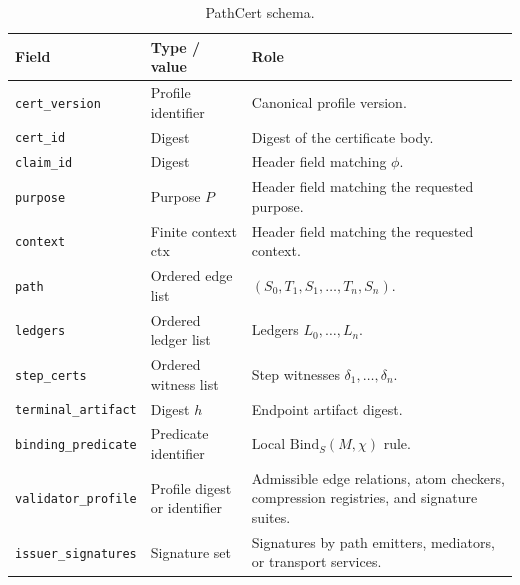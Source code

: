 \documentclass[11pt,twoside]{article}
\newcommand{\OGSchemaTableFont}{\footnotesize}
\newcommand{\OGTableHeaderRow}{\rowcolor{tableheaderbg}}
\newcommand{\TableHeaderRow}{\OGTableHeaderRow}
\newenvironment{OGTable}[2][ht]{%
  \begin{table}[#1]
  \centering
  #2
  \renewcommand{\arraystretch}{1.08}%
  \rowcolors{2}{tablerowbg}{white}%
}{%
  \rowcolors{2}{}{}%
  \end{table}%
}
\theoremstyle{definition}
\newcommand{\Bind}{\mathrm{Bind}}
\newcommand{\ctx}{\mathrm{ctx}}
\begin{document}
\begin{OGTable}{\OGSchemaTableFont}
\begin{tabularx}{\textwidth}{>{\raggedright\arraybackslash}p{}>{\raggedright\arraybackslash}p{}>{\raggedright\arraybackslash}X}
\toprule
\TableHeaderRow \textbf{Field} & \textbf{Type / value} & \textbf{Role} \\
\midrule
\texttt{cert\_version} & Profile identifier & Canonical profile version. \\
\texttt{cert\_id} & Digest & Digest of the certificate body. \\
\texttt{claim\_id} & Digest & Header field matching $\phi$. \\
\texttt{purpose} & Purpose $P$ & Header field matching the requested purpose. \\
\texttt{context} & Finite context $\ctx$ & Header field matching the requested context. \\
\texttt{path} & Ordered edge list & $(S_0,T_1,S_1,\ldots,T_n,S_n)$. \\
\texttt{ledgers} & Ordered ledger list & Ledgers $L_0,\ldots,L_n$. \\
\texttt{step\_certs} & Ordered witness list & Step witnesses $\delta_1,\ldots,\delta_n$. \\
\texttt{terminal\_artifact} & Digest $h$ & Endpoint artifact digest. \\
\texttt{binding\_predicate} & Predicate identifier & Local $\Bind_S(M,\chi)$ rule. \\
\texttt{validator\_profile} & Profile digest or identifier & Admissible edge relations, atom checkers, compression registries, and signature suites. \\
\texttt{issuer\_signatures} & Signature set & Signatures by path emitters, mediators, or transport services. \\
\bottomrule
\end{tabularx}
\caption{PathCert schema.}
\label{tab:pathcert-schema}
\end{OGTable}
\FloatBarrier
\end{document}
